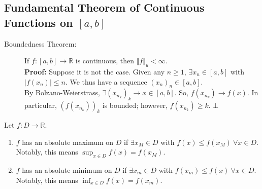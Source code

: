 \documentclass[10pt]{extarticle}
\newcommand{\R}{\mathbb{R}}
\begin{document}
  \subsection{Fundamental Theorem of Continuous Functions on $[a,b]$}%
    \begin{description}
      \item[Boundedness Theorem:] If $f: [a,b] \rightarrow \R$ is continuous, then $\Vert f \Vert_{u} < \infty$.\\

        \textbf{Proof:} Suppose it is not the case. Given any $n\geq 1$, $\exists x_n\in [a,b]$ with $|f(x_n)|\leq n$. We thus have a sequence $(x_n)_n\in [a,b]$.\\

        By Bolzano-Weierstrass, $\exists (x_{n_k})_k \rightarrow x\in [a,b]$. So, $f(x_{n_k})\rightarrow f(x)$. In particular, $(f(x_{n_k}))_k$ is bounded; however, $f(x_{n_k})\geq k$. $\bot$
    \end{description}
    Let $f: D\rightarrow \R$.
    \begin{enumerate}[(1)]
      \item $f$ has an absolute maximum on $D$ if $\exists x_M\in D$ with $f(x) \leq f(x_M)~\forall x\in D$. Notably, this means $\sup_{x\in D}f(x) = f(x_M)$.
      \item $f$ has an absolute minimum on $D$ if $\exists x_m\in D$ with $f(x_m)\leq f(x)~\forall x\in D$. Notably, this means $\inf_{x\in D} f(x) = f(x_m)$.
    \end{enumerate}
\end{document}

